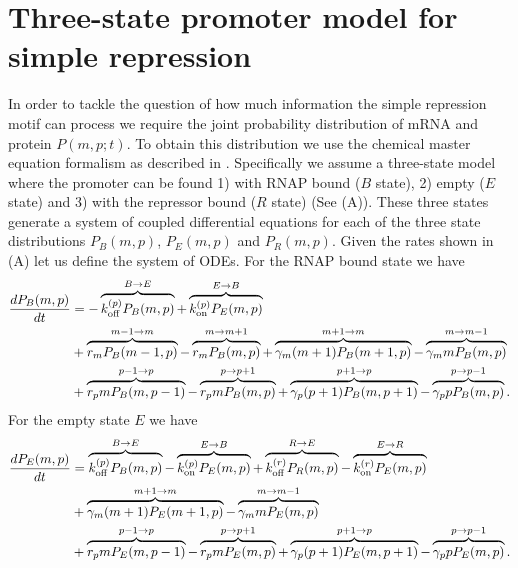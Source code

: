 \section{Three-state promoter model for simple repression}\label{supp_model}

In order to tackle the question of how much information the simple repression
motif can process we require the joint probability distribution of mRNA and
protein $P(m, p; t)$. To obtain this distribution we use the chemical master
equation formalism as described in . Specifically we assume a
three-state model where the promoter can be found 1) with RNAP bound ($B$
state), 2) empty ($E$ state) and 3) with the repressor bound ($R$ state) (See
(A)). These three states generate a system of coupled
differential equations for each of the three state distributions $P_B(m, p)$,
$P_E(m, p)$ and $P_R(m, p)$. Given the rates shown in
(A) let us define the system of ODEs. For the RNAP
bound state we have
\begin{equation}
  \begin{aligned}
    \dt{P_B(m, p)} &=
    - \overbrace{\kpoff P_B(m, p)}^{B \rightarrow E} %
    + \overbrace{\kpon P_E(m, p)}^{E \rightarrow B}\\ %
    &+ \overbrace{r_m P_B(m-1, p)}^{m-1 \rightarrow m} %
    - \overbrace{r_m P_B(m, p)}^{m \rightarrow m+1}%
    + \overbrace{\gm (m + 1) P_B(m+1 , p)}^{m+1 \rightarrow m} %
    - \overbrace{\gm m P_B(m , p)}^{m \rightarrow m-1}\\ %
    &+ \overbrace{r_p m P_B(m, p - 1)}^{p-1 \rightarrow p} %
    - \overbrace{r_p m P_B(m, p)}^{p \rightarrow p+1} %
    + \overbrace{\gp (p + 1) P_B(m, p + 1)}^{p + 1 \rightarrow p} %
    - \overbrace{\gp p P_B(m, p)}^{p \rightarrow p-1}. %
  \end{aligned}
\end{equation}
For the empty state $E$ we have
\begin{equation}
  \begin{aligned}
    \dt{P_E(m, p)} &=
    \overbrace{\kpoff P_B(m, p)}^{B \rightarrow E} %
    - \overbrace{\kpon P_E(m, p)}^{E \rightarrow B} %
    + \overbrace{\kroff P_R(m, p)}^{R \rightarrow E} %
    - \overbrace{\kron P_E(m, p)}^{E \rightarrow R}\\ %
    &+ \overbrace{\gm (m + 1) P_E(m+1 , p)}^{m+1 \rightarrow m} %
    - \overbrace{\gm m P_E(m , p)}^{m \rightarrow m-1}\\ %
    &+ \overbrace{r_p m P_E(m, p - 1)}^{p-1 \rightarrow p} %
    - \overbrace{r_p m P_E(m, p)}^{p \rightarrow p+1} %
    + \overbrace{\gp (p + 1) P_E(m, p + 1)}^{p + 1 \rightarrow p} %
    - \overbrace{\gp p P_E(m, p)}^{p \rightarrow p-1}. %
  \end{aligned}
\end{equation}

